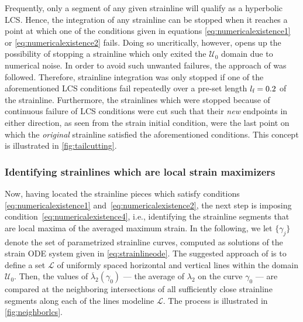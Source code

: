 Frequently, only a segment of any given strainline will qualify as a hyperbolic
LCS\@. Hence, the integration of any strainline can be stopped when it reaches
a point at which one of the conditions given in equations
\eqref{eq:numericalexistence1} or \eqref{eq:numericalexistence2} fails. Doing so
uncritically, however, opens up the possibility of stopping a strainline which
only exited the $\mathcal{U}_{0}$ domain due to numerical noise. In order to
avoid such unwanted failures, the approach of \textcite{farazmand2012computing}
was followed. Therefore, strainline integration was only stopped if one of the
aforementioned LCS conditions fail repeatedly over a pre-set length
$l_{\textnormal{f}}=0.2$ of the strainline. Furthermore, the strainlines which
were stopped because of continuous failure of LCS conditions were cut such that
their \emph{new} endpoints in either direction, as seen from the strain initial
condition, were the last point on which the \emph{original} strainline
satisfied the aforementioned conditions. This concept is illustrated in
\cref{fig:tailcutting}.



\clearpage
\subsubsection{Identifying strainlines which are local strain maximizers}
\label{ssub:identifying_strainlines_which_are_local_strain_maximizers}

Now, having located the strainline pieces which satisfy conditions
\eqref{eq:numericalexistence1} and~\eqref{eq:numericalexistence2}, the next
step is imposing condition~\eqref{eq:numericalexistence4}, i.e., identifying the
strainline segments that are local maxima of the averaged maximum strain. In
the following, we let $\{\gamma_{j}\}$ denote the set of parametrized strainline
curves, computed as solutions of the strain ODE system given in
\cref{eq:strainlineode}. The suggested approach of
\textcite{farazmand2012computing} is to define a set $\mathcal{L}$ of uniformly
spaced horizontal and vertical lines within the domain $\mathcal{U}_{0}$. Then,
the values of $\overline{\lambda}_{2}(\gamma_{0})$ --- the average of
$\lambda_{2}$ on the curve $\gamma_{0}$ --- are compared at the neighboring
intersections of all sufficiently close strainline segments along each of the
lines modeline $\mathcal{L}$. The process is illustrated in
\cref{fig:neighborlcs}.




